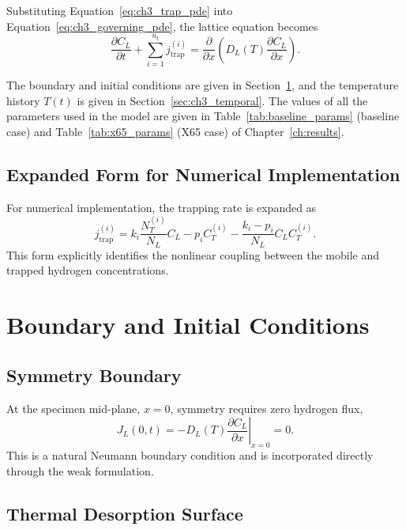 \documentclass[a4paper,12pt,oneside]{report}
\begin{document}
Substituting Equation~\eqref{eq:ch3_trap_pde} into Equation~\eqref{eq:ch3_governing_pde}, the lattice equation becomes
\begin{equation}
\frac{\partial C_L}{\partial t}
+
\sum_{i=1}^{n_t}
j_{\mathrm{trap}}^{(i)}
=
\frac{\partial}{\partial x}
\left(
D_L(T)
\frac{\partial C_L}{\partial x}
\right).
\label{eq:ch3_lattice_pde}
\end{equation}

The boundary and initial conditions are given in Section~\ref{sec:ch3_bc}, and the temperature history $T(t)$ is given in Section~\ref{sec:ch3_temporal}. The values of all the parameters used in the model are given in Table~\ref{tab:baseline_params} (baseline case) and Table~\ref{tab:x65_params} (X65 case) of Chapter~\ref{ch:results}.

\subsection{Expanded Form for Numerical Implementation}

For numerical implementation, the trapping rate is expanded as
\begin{equation}
j_{\mathrm{trap}}^{(i)}
=
k_i\frac{N_T^{(i)}}{N_L}C_L
-p_iC_T^{(i)}
-
\frac{k_i-p_i}{N_L}
C_LC_T^{(i)}.
\label{eq:ch3_mf_expanded}
\end{equation}
This form explicitly identifies the nonlinear coupling between the mobile and trapped hydrogen concentrations.

\section{Boundary and Initial Conditions}
\label{sec:ch3_bc}

\subsection{Symmetry Boundary}

At the specimen mid-plane, $x=0$, symmetry requires zero hydrogen flux,
\begin{equation}
J_L(0,t)
=
-D_L(T)
\left.
\frac{\partial C_L}{\partial x}
\right|_{x=0}
=
0.
\label{eq:ch3_symmetry}
\end{equation}
This is a natural Neumann boundary condition and is incorporated directly through the weak formulation.

\subsection{Thermal Desorption Surface}
\end{document}
